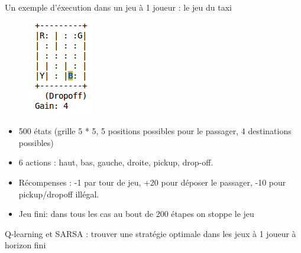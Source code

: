 \documentclass{beamer}	%
\theoremstyle{plain}
\theoremstyle{definition}
\theoremstyle{remark}
\numberwithin{equation}{section}
\begin{document}
\begin{frame}
Un exemple d'éxecution dans un jeu à 1 joueur : le jeu du taxi
\begin{figure}
\begin{minipage}[t]{0.5\linewidth}
\centering
\includegraphics[width=0.60 \textwidth,height=0.35\textheight]{photo/jeux.png}
\label{fig:side:a}
\end{minipage}%
\end{figure}
\begin{itemize}

\item 500 états (grille 5 * 5, 5 positions possibles pour le passager, 4 destinations possibles)
\item 6 actions : haut, bas, gauche, droite, pickup, drop-off.
\item Récompenses : -1 par tour de jeu, +20 pour déposer le passager, -10 pour pickup/dropoff illégal.
\item Jeu fini: dans tous les cas au bout de 200 étapes on stoppe le jeu
\end{itemize}
\end{frame}


\begin{frame}

Q-learning et SARSA : trouver une stratégie optimale dans les jeux à 1 joueur à horizon fini

\end{frame}
\end{document}
